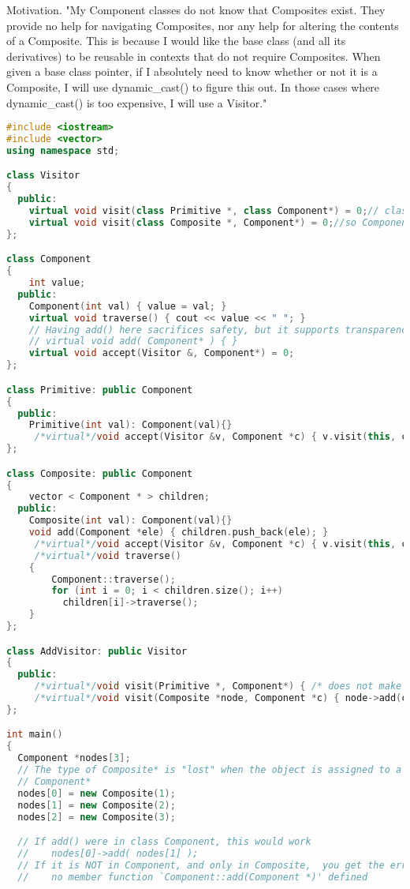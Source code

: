 \documentclass{book}
\begin{document}
Motivation. "My Component classes do not know that Composites exist. 
They provide no help for navigating Composites, nor any help for altering the contents of a Composite.
This is because I would like the base class (and all its derivatives) to be reusable in contexts that do not require Composites.
When given a base class pointer, if I absolutely need to know whether or not it is a Composite, I will use dynamic\_cast() to figure this out.
In those cases where dynamic\_cast() is too expensive, I will use a Visitor."

\begin{lstlisting}[caption={example code},label={lst:rl},language=C++]
#include <iostream>
#include <vector>
using namespace std;

class Visitor
{
  public:
    virtual void visit(class Primitive *, class Component*) = 0;// class equals forward declares
    virtual void visit(class Composite *, Component*) = 0;//so Component needs no class in front of it
};

class Component
{
    int value;
  public:
    Component(int val) { value = val; }
    virtual void traverse() { cout << value << " "; }
    // Having add() here sacrifices safety, but it supports transparency
    // virtual void add( Component* ) { }
    virtual void accept(Visitor &, Component*) = 0;
};

class Primitive: public Component
{
  public:
    Primitive(int val): Component(val){}
     /*virtual*/void accept(Visitor &v, Component *c) { v.visit(this, c); }
};

class Composite: public Component
{
    vector < Component * > children;
  public:
    Composite(int val): Component(val){}
    void add(Component *ele) { children.push_back(ele); }
     /*virtual*/void accept(Visitor &v, Component *c) { v.visit(this, c); }
     /*virtual*/void traverse()
    {
        Component::traverse();
        for (int i = 0; i < children.size(); i++)
          children[i]->traverse();
    }
};

class AddVisitor: public Visitor
{
  public:
     /*virtual*/void visit(Primitive *, Component*) { /* does not make sense */ }
     /*virtual*/void visit(Composite *node, Component *c) { node->add(c); }
};

int main()
{
  Component *nodes[3];
  // The type of Composite* is "lost" when the object is assigned to a
  // Component*
  nodes[0] = new Composite(1);
  nodes[1] = new Composite(2);
  nodes[2] = new Composite(3);

  // If add() were in class Component, this would work
  //    nodes[0]->add( nodes[1] );
  // If it is NOT in Component, and only in Composite,  you get the error -
  //    no member function `Component::add(Component *)' defined


\end{lstlisting}
\end{document}
